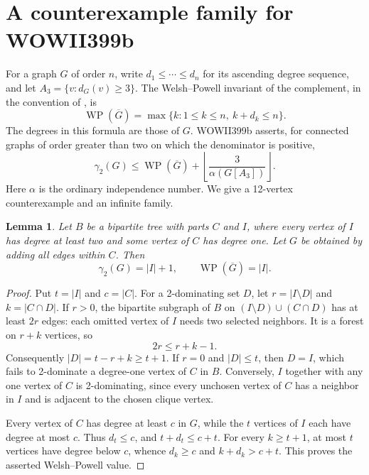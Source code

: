 \documentclass[11pt,a4paper]{article}
\newtheorem{lemma}[theorem]{Lemma}
\theoremstyle{remark}
\begin{document}
\section{A counterexample family for WOWII399b}
\label{r6:sec399b}

For a graph $G$ of order $n$, write $d_1\le\cdots\le d_n$ for its
ascending degree sequence, and let $A_3=\{v:d_G(v)\ge3\}$. The
Welsh--Powell invariant of the complement, in the convention of
\cite{WOWII}, is
\[
 \operatorname{WP}(\overline G)
 =\max\{k:1\le k\le n,\ k+d_k\le n\}.
\]
The degrees in this formula are those of $G$. WOWII399b asserts, for
connected graphs of order greater than two on which the denominator is
positive,
\begin{equation}\label{r6:eq399b}
 \gamma_2(G)\le \operatorname{WP}(\overline G)
       +\left\lfloor\frac{3}{\alpha(G[A_3])}\right\rfloor.
\end{equation}
Here $\alpha$ is the ordinary independence number. We give a
12-vertex counterexample and an infinite family.

\begin{lemma}\label{r6:split-incidence}
Let $B$ be a bipartite tree with parts $C$ and $I$, where every vertex
of $I$ has degree at least two and some vertex of $C$ has degree one.
Let $G$ be obtained by adding all edges within $C$. Then
\[
 \gamma_2(G)=|I|+1,
 \qquad \operatorname{WP}(\overline G)=|I|.
\]
\end{lemma}
\begin{proof}
Put $t=|I|$ and $c=|C|$. For a 2-dominating set $D$, let
$r=|I\setminus D|$ and $k=|C\cap D|$. If $r>0$, the bipartite
subgraph of $B$ on $(I\setminus D)\cup(C\cap D)$ has at least $2r$
edges: each omitted vertex of $I$ needs two selected neighbors.
It is a forest on $r+k$ vertices, so
\[
 2r\le r+k-1.
\]
Consequently $|D|=t-r+k\ge t+1$. If $r=0$ and $|D|\le t$, then
$D=I$, which fails to 2-dominate a degree-one vertex of $C$ in $B$.
Conversely, $I$ together with any one vertex of $C$ is 2-dominating,
since every unchosen vertex of $C$ has a neighbor in $I$ and is
adjacent to the chosen clique vertex.

Every vertex of $C$ has degree at least $c$ in $G$, while the $t$
vertices of $I$ each have degree at most $c$. Thus $d_t\le c$, and
$t+d_t\le c+t$. For every $k\ge t+1$, at most $t$ vertices have
degree below $c$, whence $d_k\ge c$ and $k+d_k>c+t$. This proves
the asserted Welsh--Powell value.
\end{proof}
\end{document}

